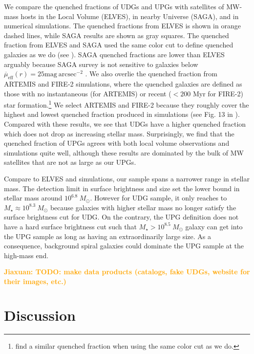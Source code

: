 \documentclass[twocolumn,astrosymb,twocolappendix]{aastex631}
\newcommand{\sbunit}{\mathrm{mag\ arcsec}^{-2}}
\newcommand{\sbeffr}{\overline{\mu}_{\mathrm{eff}}(r)}
\newcommand{\jiaxuan}[1]{\textcolor{orange}{\textbf{Jiaxuan: #1}}}
\begin{document}
\begin{CJK*}{UTF8}{gbsn}
We compare the quenched fractions of UDGs and UPGs with satellites of MW-mass hosts in the Local Volume (ELVES), in nearby Universe (SAGA), and in numerical simulations. The quenched fractions from ELVES is shown in orange dashed lines, while SAGA results are shown as gray squares. The quenched fraction from ELVES and SAGA used the same color cut to define quenched galaxies as we do (see \citealt{CarlstenELVES2022}). SAGA quenched fractions are lower than ELVES arguably because SAGA survey is not sensitive to galaxies below $\sbeffr = 25\sbunit$ \citep{Font2022}. We also overlie the quenched fraction from ARTEMIS \citep[purple lines,][]{Font2022} and FIRE-2 \citep[pink dotted lines][]{Samuel2022} simulations, where the quenched galaxies are defined as those with no instantaneous (for ARTEMIS) or recent ($<200$ Myr for FIRE-2) star formation.\footnote{\citet{Font2022} find a similar quenched fraction when using the same color cut as we do.} We select ARTEMIS and FIRE-2 because they roughly cover the highest and lowest quenched fraction produced in simulations (see Fig. 13 in \citep{Samuel2022}). Compared with these results, we see that UDGs have a higher quenched fraction which does not drop as increasing stellar mass. Surprisingly, we find that the quenched fraction of UPGs agrees with both local volume observations and simulations quite well, although these results are dominated by the bulk of MW satellites that are not as large as our UPGs. 

Compare to ELVES and simulations, our sample spans a narrower range in stellar mass. The detection limit in surface brightness and size set the lower bound in stellar mass around $10^{6.8}\ M_\odot$. However for UDG sample, it only reaches to $M_\star\approx 10^{8.3}\ M_\odot$ because galaxies with higher stellar mass no longer satisfy the surface brightness cut for UDG. On the contrary, the UPG definition does not have a hard surface brightness cut such that $M_\star > 10^{8.5}\ M_\odot$ galaxy can get into the UPG sample as long as having an extraordinarily large size. As a consequence, background spiral galaxies could dominate the UPG sample at the high-mass end.


\jiaxuan{TODO: make data products (catalogs, fake UDGs, website for their images, etc.)}

\section{Discussion}\label{sec:discussion}


\end{CJK*}
\end{document}
